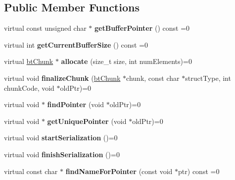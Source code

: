 \subsection*{Public Member Functions}
\begin{DoxyCompactItemize}
\item 
\mbox{\label{classbtSerializer_ab61470624eb1e6d06d7de2943d2d92d0}} 
virtual const unsigned char $\ast$ {\bfseries get\+Buffer\+Pointer} () const =0
\item 
\mbox{\label{classbtSerializer_a49fa3c64ab1504a7a158f02c174e114f}} 
virtual int {\bfseries get\+Current\+Buffer\+Size} () const =0
\item 
\mbox{\label{classbtSerializer_a0bc96e86971e3410f66bc64bbce8ec81}} 
virtual \hyperlink{classbtChunk}{bt\+Chunk} $\ast$ {\bfseries allocate} (size\+\_\+t size, int num\+Elements)=0
\item 
\mbox{\label{classbtSerializer_ac98913802b276eed28d745ef422ac724}} 
virtual void {\bfseries finalize\+Chunk} (\hyperlink{classbtChunk}{bt\+Chunk} $\ast$chunk, const char $\ast$struct\+Type, int chunk\+Code, void $\ast$old\+Ptr)=0
\item 
\mbox{\label{classbtSerializer_a6f0e64395af88f0a3f43bf0b4ed90a39}} 
virtual void $\ast$ {\bfseries find\+Pointer} (void $\ast$old\+Ptr)=0
\item 
\mbox{\label{classbtSerializer_ab47015de46266c378ebba6329e71a5d6}} 
virtual void $\ast$ {\bfseries get\+Unique\+Pointer} (void $\ast$old\+Ptr)=0
\item 
\mbox{\label{classbtSerializer_a7ab4fa452564cb52eec170cc6ee9f133}} 
virtual void {\bfseries start\+Serialization} ()=0
\item 
\mbox{\label{classbtSerializer_a73de9ac3f916608e26ea0f5f16939abc}} 
virtual void {\bfseries finish\+Serialization} ()=0
\item 
\mbox{\label{classbtSerializer_a1486d0a4683e152dd3f17a083d8e88f7}} 
virtual const char $\ast$ {\bfseries find\+Name\+For\+Pointer} (const void $\ast$ptr) const =0

\end{DoxyCompactItemize}

